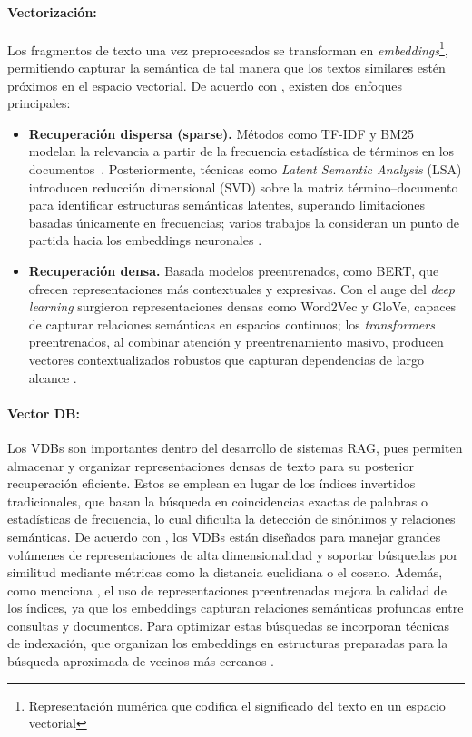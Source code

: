 \paragraph{Vectorización:} Los fragmentos de texto una vez preprocesados se transforman en \emph{embeddings}\footnote{Representación numérica que codifica el significado del texto en un espacio vectorial}, permitiendo capturar la semántica de tal manera que los textos similares estén próximos en el espacio vectorial. De acuerdo con \textcite{hu2024ragrau}, existen dos enfoques principales:

\begin{itemize}
\item \textbf{Recuperación dispersa (sparse).} Métodos como TF-IDF y BM25 modelan la relevancia a partir de la frecuencia estadística de términos en los documentos~\parencite{fan2021pretraining}. Posteriormente, técnicas como \emph{Latent Semantic Analysis} (LSA) introducen reducción dimensional (SVD) sobre la matriz término–documento para identificar estructuras semánticas latentes, superando limitaciones basadas únicamente en frecuencias; varios trabajos la consideran un punto de partida hacia los embeddings neuronales \parencite{fan2021pretraining,minaee2021}.
\item \textbf{Recuperación densa.} Basada modelos preentrenados, como BERT, que ofrecen representaciones más contextuales y expresivas. Con el auge del \emph{deep learning} surgieron representaciones densas como Word2Vec y GloVe, capaces de capturar relaciones semánticas en espacios continuos; los \emph{transformers} preentrenados, al combinar atención y preentrenamiento masivo, producen vectores contextualizados robustos que capturan dependencias de largo alcance \parencite{casola2022pretrained}.
\end{itemize}

\paragraph{Vector DB:}
Los VDBs son importantes dentro del desarrollo de sistemas RAG, pues permiten almacenar y organizar representaciones densas de texto para su posterior
recuperación eficiente. Estos se emplean en lugar de los índices invertidos tradicionales, que basan la búsqueda en coincidencias exactas de palabras o estadísticas 
de frecuencia, lo cual dificulta la detección de sinónimos y relaciones semánticas. De acuerdo con \textcite{jing2024vecdb}, los VDBs están diseñados para manejar 
grandes volúmenes de representaciones de alta dimensionalidad y soportar búsquedas por similitud mediante métricas como la distancia euclidiana o el coseno. Además, 
como menciona \textcite{fan2021pretraining}, el uso de representaciones preentrenadas mejora la calidad de los índices, ya que los embeddings capturan relaciones 
semánticas profundas entre consultas y documentos. Para optimizar estas búsquedas se incorporan técnicas de indexación, que organizan los embeddings en estructuras preparadas para la búsqueda aproximada de vecinos más cercanos \parencite{ma2025vector}.  

